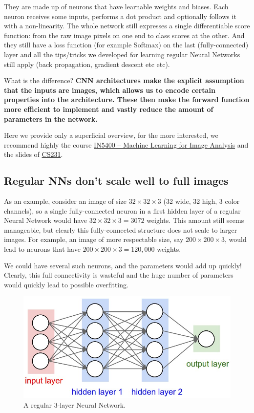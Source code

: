 \documentclass[%
oneside,                 %
final,                   %
10pt]{article}
\begin{document}
They are made up of neurons that have learnable weights and
biases. Each neuron receives some inputs, performs a dot product and
optionally follows it with a non-linearity. The whole network still
expresses a single differentiable score function: from the raw image
pixels on one end to class scores at the other. And they still have a
loss function (for example Softmax) on the last (fully-connected) layer
and all the tips/tricks we developed for learning regular Neural
Networks still apply (back propagation, gradient descent etc etc).

What is the difference? \textbf{CNN architectures make the explicit assumption that
the inputs are images, which allows us to encode certain properties
into the architecture. These then make the forward function more
efficient to implement and vastly reduce the amount of parameters in
the network.}

Here we provide only a superficial overview, for the more interested, we recommend highly the course
\href{{https://www.uio.no/studier/emner/matnat/ifi/IN5400/index-eng.html}}{IN5400 – Machine Learning for Image Analysis}
and the slides of \href{{http://cs231n.github.io/convolutional-networks/}}{CS231}.

\subsection{Regular NNs don’t scale well to full images}

As an example, consider
an image of size $32\times 32\times 3$ (32 wide, 32 high, 3 color channels), so a
single fully-connected neuron in a first hidden layer of a regular
Neural Network would have $32\times 32\times 3 = 3072$ weights. This amount still
seems manageable, but clearly this fully-connected structure does not
scale to larger images. For example, an image of more respectable
size, say $200\times 200\times 3$, would lead to neurons that have 
$200\times 200\times 3 = 120,000$ weights. 

We could have
several such neurons, and the parameters would add up quickly! Clearly,
this full connectivity is wasteful and the huge number of parameters
would quickly lead to possible overfitting.


\begin{figure}[!ht]  %
  \centerline{\includegraphics[width=0.6\linewidth]{figslides/nn.jpeg}}
  \caption{
  A regular 3-layer Neural Network.
  }
\end{figure}
\end{document}
